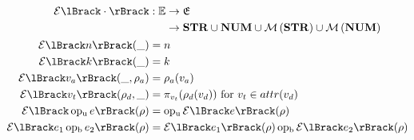 \begin{align}
    \expsem{\cdot} &: \begin{aligned}[t]
        \expressions &\rightarrow \environments \\
        &\rightarrow \strings \cup \integers \cup \powerbag{\strings} \cup \powerbag{\integers}
    \end{aligned} \\
    \expsem{n}(\_) &= n \\
    \expsem{k}(\_) &= k \\
    \expsem{v_a}(\_, \environment_a) &=  \environment_a(v_a) \\
    \expsem{v_t}(\environment_d, \_) &= \pi_{v_t}(\rho_d(v_d)) \text{ for } v_t \in attr(v_d) \\
    \expsem{\unaryoperator e}(\environment) &= \unaryoperator \expsem{e}(\environment) \\
    \expsem{e_1 \binaryoperator e_2}(\environment) &= \expsem{e_1}(\environment) \binaryoperator \expsem{e_2}(\environment)
\end{align}


